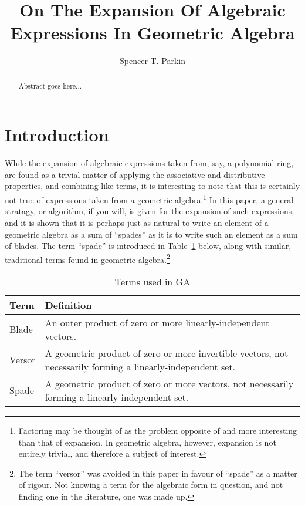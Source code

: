 \documentclass{birkjour}
\theoremstyle{definition}
\theoremstyle{remark}
\numberwithin{equation}{section}
\begin{document}
\title{On The Expansion Of Algebraic Expressions In Geometric Algebra}

\author{Spencer T. Parkin}



\begin{abstract}
Abstract goes here...
\end{abstract}


\maketitle

\section{Introduction}

While the expansion of algebraic expressions taken from, say, a polynomial ring, are found as a trivial matter
of applying the associative and distributive properties, and combining like-terms, it is interesting to note
that this is certainly not true of expressions taken from a geometric algebra.\footnote{Factoring may be thought of as the problem opposite of and more
interesting than that of expansion.  In geometric algebra, however, expansion is not entirely trivial, and therefore a subject of interest.}
In this paper, a general stratagy, or algorithm, if you will, is given for the expansion of such expressions, and it is shown that
it is perhaps just as natural to write an element of a geometric algebra as a sum of ``spades'' as it is to
write such an element as a sum of blades.  The term ``spade'' is introduced in Table~\ref{tbl_terms} below,
along with similar, traditional terms found in geometric algebra.\footnote{The term ``versor'' was avoided in
this paper in favour of ``spade'' as a matter of rigour.  Not knowing a term for the algebraic form in question, and not finding
one in the literature, one was made up.}

\begin{table}[H]\label{tbl_terms}\caption{Terms used in GA}
\begin{tabular}{p{1cm}p{9cm}}
Term & Definition \\
\hline
Blade & An outer product of zero or more linearly-independent vectors. \\
Versor & A geometric product of zero or more invertible vectors, not necessarily forming a linearly-independent set. \\
Spade & A geometric product of zero or more vectors, not necessarily forming a linearly-independent set.
\end{tabular}
\end{table}
\end{document}
